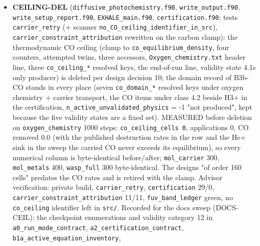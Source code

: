 \documentclass[english,a4paper]{my_memo}
\begin{document}
\begin{itemize}
  steps move by at most 3.6e-3 / 1.1e-2 (cooling breakdown), n\_He/n\_H by
  \textless= 6e-5, base \texttt{rho\ v\ r\^{}2} by \textless= 1e-6: far below the design\textquotesingle s estimate
  because at 1000 steps the elements have not separated from the reservoir
  ratio; the converged 12000-step pair is open in the design document.
  Outside scope recorded: ESWENO3 measures second order on a smooth profile
  (1.92 against PLM 1.97, face error 8x PLM), a property of the primitive
  reconstruction to look at (WENO3-ORDER); \texttt{hp\_*} cases need
  \texttt{output/Hydro\_ioniz\_IC.txt} in place; \texttt{element\_flux\_profile.txt} has a
  trailing text column.
\item
  \textbf{CEILING-DEL} (\texttt{diffusive\_photochemistry.f90}, \texttt{write\_output.f90},
  \texttt{write\_setup\_report.f90}, \texttt{EXHALE\_main.f90}, \texttt{certification.f90}; tests
  \texttt{carrier\_retry} (+ scanner \texttt{no\_CO\_ceiling\_identifier\_in\_src}),
  \texttt{carrier\_constraint\_attribution} rewritten on the carbon clamp): the
  thermodynamic CO ceiling (clamp to \texttt{co\_equilibrium\_density}, four
  counters, attempted twins, three accessors, \texttt{Oxygen\_chemistry.txt} header
  line, three \texttt{co\_ceiling\_*} resolved keys, the end-of-run line, validity
  state 4.1\textquotesingle s only producer) is deleted per design decision 10; the domain
  record of B3b-CO stands in every place (seven \texttt{co\_domain\_*} resolved keys
  under oxygen chemistry + carrier transport, the CO items under class 4.2
  beside H3+ in the certification, \texttt{n\_active\_unvalidated\_physics} = -1 "not
  produced", kept because the five validity states are a fixed set). MEASURED
  before deletion on \texttt{oxygen\_chemistry} 1000 steps: \texttt{co\_ceiling\_cells\ 0},
  applications 0, CO removed 0.0 (with the published destruction rates in
  the row and the He+ sink in the sweep the carried CO never exceeds its
  equilibrium), so every numerical column is byte-identical before/after;
  \texttt{mol\_carrier} 300, \texttt{mol\_metals} 400, \texttt{wasp\_full} 300 byte-identical. The
  design\textquotesingle s "of order 160 cells" predates the CO rates and is retired with the
  clamp. Advisor verification: private build, \texttt{carrier\_retry}, \texttt{certification}
  29/0, \texttt{carrier\_constraint\_attribution} 11/11, \texttt{fuv\_band\_ledger} green, no
  \texttt{co\_ceiling} identifier left in \texttt{src/}. Recorded for the docs sweep
  (DOCS-CEIL): the checkpoint enumerations and validity category 12 in
  \texttt{a0\_run\_mode\_contract}, \texttt{a2\_certification\_contract}, \texttt{b1a\_active\_equation\_inventory},

\end{itemize}
\end{document}
